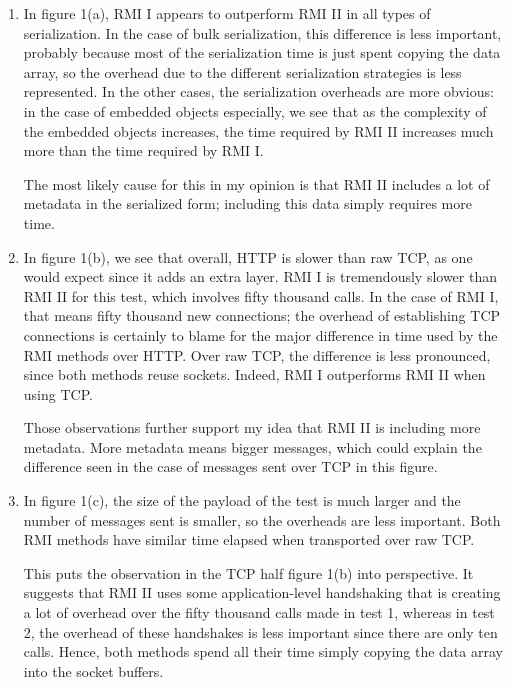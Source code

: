 \documentclass{article}
\begin{document}
\begin{enumerate}
    \item
        In figure 1(a), RMI I appears to outperform RMI II in all types of
        serialization. In the case of bulk serialization, this difference is
        less important, probably because most of the serialization time is just
        spent copying the data array, so the overhead due to the different
        serialization strategies is less represented. In the other cases, the
        serialization overheads are more obvious: in the case of embedded
        objects especially, we see that as the complexity of the embedded
        objects increases, the time required by RMI II increases much more than
        the time required by RMI I.

        The most likely cause for this in my opinion is that RMI II includes a
        lot of metadata in the serialized form; including this data simply
        requires more time.

    \item
        In figure 1(b), we see that overall, HTTP is slower than raw TCP, as
        one would expect since it adds an extra layer. RMI I is tremendously
        slower than RMI II for this test, which involves fifty thousand calls.
        In the case of RMI I, that means fifty thousand new connections; the
        overhead of establishing TCP connections is certainly to blame for the
        major difference in time used by the RMI methods over HTTP. Over raw
        TCP, the difference is less pronounced, since both methods reuse
        sockets. Indeed, RMI I outperforms RMI II when using TCP.

        Those observations further support my idea that RMI II is including
        more metadata. More metadata means bigger messages, which could explain
        the difference seen in the case of messages sent over TCP in this
        figure.

    \item
        In figure 1(c), the size of the payload of the test is much larger and
        the number of messages sent is smaller, so the overheads are less
        important. Both RMI methods have similar time elapsed when transported
        over raw TCP.

        This puts the observation in the TCP half figure 1(b) into perspective.
        It suggests that RMI II uses some application-level handshaking that is
        creating a lot of overhead over the fifty thousand calls made in test
        1, whereas in test 2, the overhead of these handshakes is less
        important since there are only ten calls. Hence, both methods spend all
        their time simply copying the data array into the socket buffers.


\end{enumerate}
\end{document}
